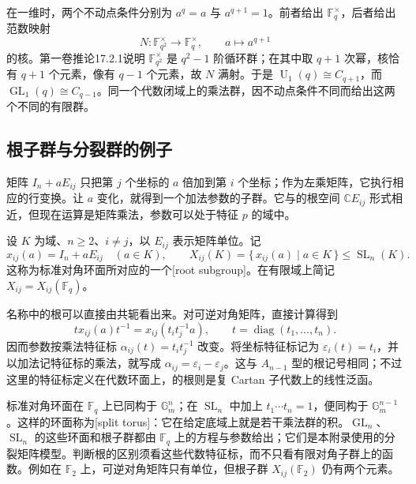 \ProseParagraphBreak

在一维时，两个不动点条件分别为 \(a^q=a\) 与 \(a^{q+1}=1\)。前者给出 \(\mathbb F_q^\times\)，后者给出范数映射
\[
	N:\mathbb F_{q^2}^\times\longrightarrow\mathbb F_q^\times,\qquad a\longmapsto a^{q+1}
\]
的核。第一卷推论17.2.1说明 \(\mathbb F_{q^2}^\times\) 是 \(q^2-1\) 阶循环群；在其中取 \(q+1\) 次幂，核恰有 \(q+1\) 个元素，像有 \(q-1\) 个元素，故 \(N\) 满射。于是 \(\operatorname U_1(q)\cong C_{q+1}\)，而 \(\operatorname{GL}_1(q)\cong C_{q-1}\)。同一个代数闭域上的乘法群，因不动点条件不同而给出这两个不同的有限群。

\subsection{根子群与分裂群的例子}
\label{b5:subsec:F01:03}

矩阵 \(I_n+aE_{ij}\) 只把第 \(j\) 个坐标的 \(a\) 倍加到第 \(i\) 个坐标；作为左乘矩阵，它执行相应的行变换。让 \(a\) 变化，就得到一个加法参数的子群。它与的根空间 \(\mathbb CE_{ij}\) 形式相近，但现在运算是矩阵乘法，参数可以处于特征 \(p\) 的域中。

\begin{definition}\label{b5:def:F-root-subgroups}
	设 \(K\) 为域、\(n\ge2\)、\(i\ne j\)，以 \(E_{ij}\) 表示矩阵单位。记
	\[
		x_{ij}(a)=I_n+aE_{ij}\quad(a\in K),\qquad
		X_{ij}(K)=\{\,x_{ij}(a)\mid a\in K\,\}\le\operatorname{SL}_n(K).
	\]
	这称为标准对角环面所对应的一个[root subgroup]。在有限域上简记 \(X_{ij}=X_{ij}(\mathbb F_q)\)。
\end{definition}
名称中的根可以直接由共轭看出来。对可逆对角矩阵，直接计算得到
\[
	tx_{ij}(a)t^{-1}=x_{ij}(t_i t_j^{-1}a),\qquad
	t=\operatorname{diag}(t_1,\ldots,t_n).
\]
因而参数按乘法特征标 \(\alpha_{ij}(t)=t_i t_j^{-1}\) 改变。将坐标特征标记为 \(\varepsilon_i(t)=t_i\)，并以加法记特征标的乘法，就写成 \(\alpha_{ij}=\varepsilon_i-\varepsilon_j\)。这与 \(A_{n-1}\) 型的根记号相同；不过这里的特征标定义在代数环面上，的根则是复 Cartan 子代数上的线性泛函。

\ProseParagraphBreak

标准对角环面在 \(\mathbb F_q\) 上已同构于 \(\mathbb G_m^n\)；在 \(\operatorname{SL}_n\) 中加上 \(t_1\cdots t_n=1\)，便同构于 \(\mathbb G_m^{n-1}\)。这样的环面称为[split torus]：它在给定底域上就是若干乘法群的积。\(\operatorname{GL}_n\)、\(\operatorname{SL}_n\) 的这些环面和根子群都由 \(\mathbb F_q\) 上的方程与参数给出；它们是本附录使用的分裂矩阵模型。判断根的区别须看这些代数特征标，而不只看有限对角子群上的函数。例如在 \(\mathbb F_2\) 上，可逆对角矩阵只有单位，但根子群 \(X_{ij}(\mathbb F_2)\) 仍有两个元素。

